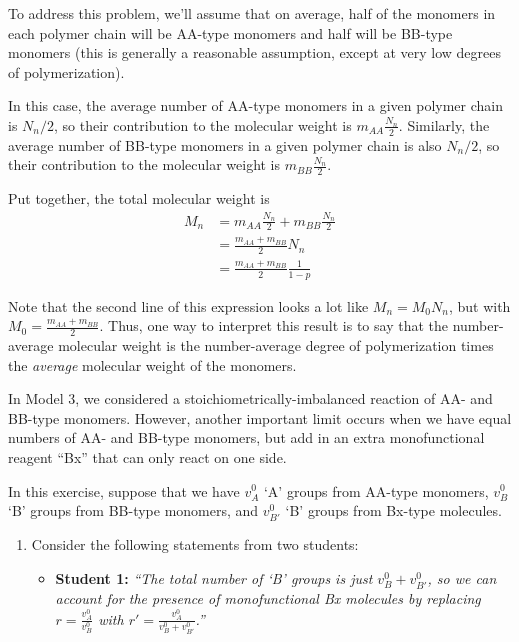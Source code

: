 \begin{activity}
\begin{exercises}
\begin{enumerate}
					\begin{solution}
						To address this problem, we'll assume that on average, half of the monomers in each polymer chain will be AA-type monomers and half will be BB-type monomers (this is generally a reasonable assumption, except at very low degrees of polymerization).
						
						In this case, the average number of AA-type monomers in a given polymer chain is $N_n/2$, so their contribution to the molecular weight is $m_{AA}\frac{N_n}{2}$.  Similarly, the average number of BB-type monomers in a given polymer chain is also $N_n/2$, so their contribution to the molecular weight is $m_{BB}\frac{N_n}{2}$.
						
						Put together, the total molecular weight is
						\begin{align*}
							M_n &= m_{AA}\frac{N_n}{2} + m_{BB}\frac{N_n}{2}\\
								&= \frac{m_{AA} + m_{BB}}{2} N_n\\
								&= \frac{m_{AA} + m_{BB}}{2} \frac{1}{1-p}
						\end{align*}
						
						Note that the second line of this expression looks a lot like $M_n = M_0 N_n$, but with $M_0 = \frac{m_{AA} + m_{BB}}{2}$.  Thus, one way to interpret this result is to say that the number-average molecular weight is the number-average degree of polymerization times the \emph{average} molecular weight of the monomers.
					\end{solution}
				
			\end{enumerate}
		
		\exercise In Model 3, we considered a stoichiometrically-imbalanced reaction of AA- and BB-type monomers.  However, another important limit occurs when we have equal numbers of AA- and BB-type monomers, but add in an extra monofunctional reagent ``Bx'' that can only react on one side.
		
			In this exercise, suppose that we have $v_A^0$ `A' groups from AA-type monomers, $v_B^0$ `B' groups from BB-type monomers, and $v_{B'}^0$ `B' groups from Bx-type molecules.
		
			\begin{enumerate}
				\item Consider the following statements from two students:
					
					\begin{itemize}
				
					\item \textbf{Student 1:} \emph{``The total number of `B' groups is just $v_B^0 + v_{B'}^0$, so we can account for the presence of monofunctional Bx molecules by replacing $r=\frac{v_A^0}{v_B^0}$ with $r'=\frac{v_A^0}{v_B^0 + v_{B'}^0}$.''}
					

\end{itemize}
\end{enumerate}
\end{exercises}
\end{activity}
